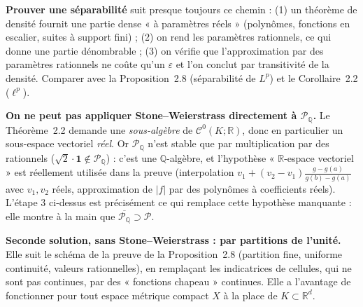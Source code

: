 \documentclass[11pt,a4paper]{article}
\newcommand{\R}{\mathbb{R}}
\newcommand{\Q}{\mathbb{Q}}
\newcommand{\adh}[1]{\overline{#1}}
\newcommand{\Cz}{\mathcal{C}^0}
\theoremstyle{definition}
\begin{document}
\begin{methode}
\textbf{Prouver une séparabilité} suit presque toujours ce chemin : (1) un théorème de densité fournit une partie dense « à paramètres réels » (polynômes, fonctions en escalier, suites à support fini) ; (2) on rend les paramètres rationnels, ce qui donne une partie dénombrable ; (3) on vérifie que l'approximation par des paramètres rationnels ne coûte qu'un $\varepsilon$ et l'on conclut par transitivité de la densité. Comparer avec la Proposition~2.8 (séparabilité de $L^p$) et le Corollaire~2.2 ($\ell^p$).
\end{methode}

\begin{piege}
\textbf{On ne peut pas appliquer Stone--Weierstrass directement à $\mathcal P_\Q$.} Le Théorème~2.2 demande une \emph{sous-algèbre} de $\Cz(K;\R)$, donc en particulier un sous-espace vectoriel \emph{réel}. Or $\mathcal P_\Q$ n'est stable que par multiplication par des rationnels ($\sqrt2\cdot\mathbf 1\notin\mathcal P_\Q$) : c'est une $\Q$-algèbre, et l'hypothèse « $\R$-espace vectoriel » est réellement utilisée dans la preuve (interpolation $v_1+(v_2-v_1)\frac{g-g(a)}{g(b)-g(a)}$ avec $v_1,v_2$ réels, approximation de $|f|$ par des polynômes à coefficients réels). L'étape 3 ci-dessus est précisément ce qui remplace cette hypothèse manquante : elle montre à la main que $\adh{\mathcal P_\Q}\supset\mathcal P$.
\end{piege}

\bigskip
\noindent\textbf{Seconde solution, sans Stone--Weierstrass : par partitions de l'unité.} Elle suit le schéma de la preuve de la Proposition~2.8 (partition fine, uniforme continuité, valeurs rationnelles), en remplaçant les indicatrices de cellules, qui ne sont pas continues, par des « fonctions chapeau » continues. Elle a l'avantage de fonctionner pour tout espace métrique compact $X$ à la place de $K\subset\R^d$.
\end{document}
